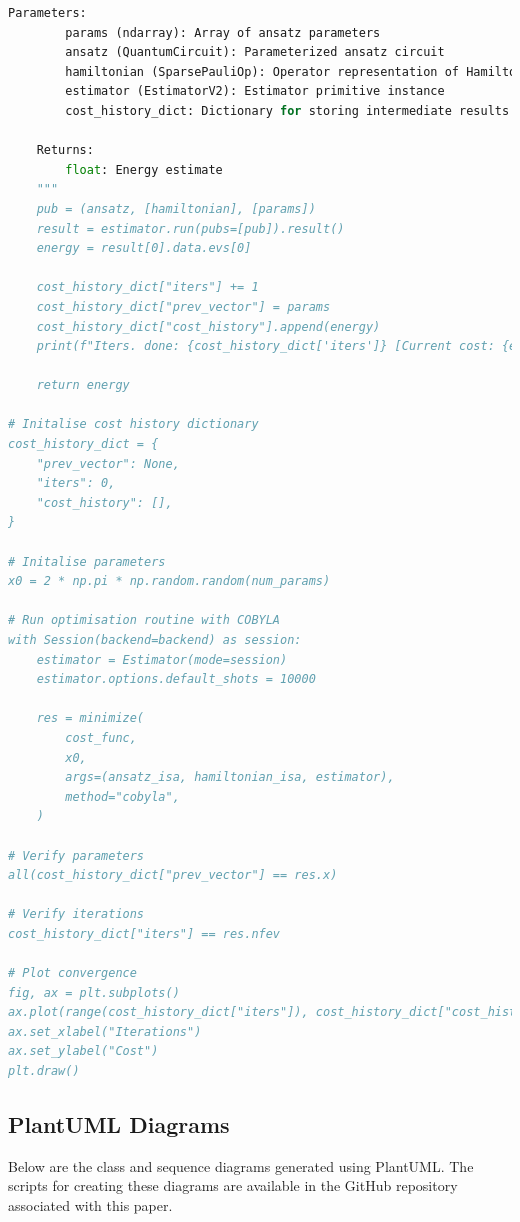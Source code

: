 \documentclass{article}
\begin{document}
\begin{lstlisting}[language=Python]
    Parameters:
        params (ndarray): Array of ansatz parameters
        ansatz (QuantumCircuit): Parameterized ansatz circuit
        hamiltonian (SparsePauliOp): Operator representation of Hamiltonian
        estimator (EstimatorV2): Estimator primitive instance
        cost_history_dict: Dictionary for storing intermediate results

    Returns:
        float: Energy estimate
    """
    pub = (ansatz, [hamiltonian], [params])
    result = estimator.run(pubs=[pub]).result()
    energy = result[0].data.evs[0]

    cost_history_dict["iters"] += 1
    cost_history_dict["prev_vector"] = params
    cost_history_dict["cost_history"].append(energy)
    print(f"Iters. done: {cost_history_dict['iters']} [Current cost: {energy}]")

    return energy

# Initalise cost history dictionary
cost_history_dict = {
    "prev_vector": None,
    "iters": 0,
    "cost_history": [],
}

# Initalise parameters
x0 = 2 * np.pi * np.random.random(num_params)

# Run optimisation routine with COBYLA
with Session(backend=backend) as session:
    estimator = Estimator(mode=session)
    estimator.options.default_shots = 10000

    res = minimize(
        cost_func,
        x0,
        args=(ansatz_isa, hamiltonian_isa, estimator),
        method="cobyla",
    )

# Verify parameters
all(cost_history_dict["prev_vector"] == res.x)

# Verify iterations
cost_history_dict["iters"] == res.nfev

# Plot convergence
fig, ax = plt.subplots()
ax.plot(range(cost_history_dict["iters"]), cost_history_dict["cost_history"])
ax.set_xlabel("Iterations")
ax.set_ylabel("Cost")
plt.draw()

\end{lstlisting}

\subsection{PlantUML Diagrams}

Below are the class and sequence diagrams generated using PlantUML. The scripts for creating these diagrams are available in the GitHub repository associated with this paper\cite{ellygithub}.
\end{document}
